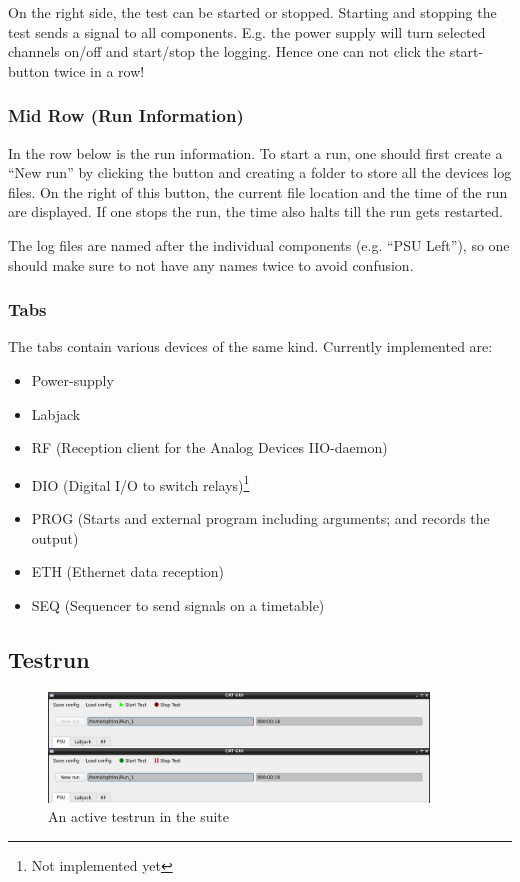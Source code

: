 \documentclass[10pt,a4paper]{article}
\begin{document}
	\bigbreak
	
	On the right side, the test can be started or stopped. Starting and stopping the test sends a signal to all components. E.g. the power supply will turn selected channels on/off and start/stop the logging. Hence one can not click the start-button twice in a row!
	
	\subsubsection{Mid Row (Run Information)}
	
	In the row below is the run information. To start a run, one should first create a \enquote{New run} by clicking the button and creating a folder to store all the devices log files. On the right of this button, the current file location and the time of the run are displayed. If one stops the run, the time also halts till the run gets restarted. 

	\bigbreak	
	
	The log files are named after the individual components (e.g. \enquote{PSU Left}), so one should make sure to not have any names twice to avoid confusion.
	
	\subsubsection{Tabs}
	
	The tabs contain various devices of the same kind. Currently implemented are:
	
	\begin{itemize}
\item Power-supply
\item Labjack
\item RF (Reception client for the Analog Devices IIO-daemon)
\item DIO (Digital I/O to switch relays)\footnote{Not implemented yet}
\item PROG (Starts and external program including arguments; and records the output)
\item ETH (Ethernet data reception)
\item SEQ (Sequencer to send signals on a timetable)
	\end{itemize}		
	
	\subsection{Testrun}	
	
	\begin{figure}[H]
\centering
\includegraphics[width=0.9\textwidth]{./4_Testrun.png}
\caption{An active testrun in the suite}
	\end{figure}
	
\end{document}
